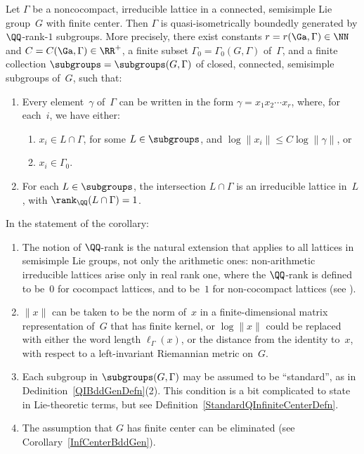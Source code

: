 \begin{cor} \label{QIBddGenLie}
Let $\Gamma$ be a noncocompact, irreducible lattice in a connected, semisimple Lie group~$G$ with finite center. Then $\Gamma$ is quasi-isometrically boundedly generated by $\QQ$-rank-$1$ subgroups. More precisely, there exist constants $r = r(\Ga,\Gamma) \in \NN$ and $C = C(\Ga,\Gamma) \in \RR^+$, a finite subset $\Gamma_0 = \Gamma_0(G,\Gamma)$ of~$\Gamma$, and a finite collection $\subgroups = \subgroups(G,\Gamma)$ of closed, connected, semisimple subgroups of~$G$, such that:
	\begin{enumerate}\itemsep=0pt
\item[$1.$] %
	 Every element~$\gamma$ of~$\Gamma$ can be written in the form $\gamma = x_1 x_2 \cdots x_r$, where, for each~$i$, we have either:
\begin{enumerate}\itemsep=0pt
\item[$(a)$] %
		$x_i \in L \cap \Gamma$, for some $L \in \subgroups$, and $\log \|x_i\| \le C \log \|\gamma\|$,
		or
\item[$(b)$] $x_i \in \Gamma_0$.
		\end{enumerate}
\item[$2.$] For each $L \in \subgroups$, the intersection $L \cap \Gamma$ is an irreducible lattice in~$L$, with $\rank_\QQ (L \cap \Gamma) = 1$.

	\end{enumerate}
\end{cor}

\begin{rems}
In the statement of the corollary:
\begin{enumerate}\itemsep=0pt
	\item The notion of $\QQ$-rank is the natural extension that applies to all lattices in semisimple Lie groups, not only the arithmetic ones: non-arithmetic irreducible lattices arise only in real rank one, where the $\QQ$-rank is defined to be~$0$ for cocompact lattices, and to be~$1$ for non-cocompact lattices (see \cite[Definition~9.1.8, pp.~193--194]{Morris-IntroArithGrps}).
	\item $\| x \|$ can be taken to be the norm of~$x$ in a finite-dimensional matrix representation of~$G$ that has finite kernel, or $\log \|x\|$ could be replaced with either the word length $\ell_\Gamma(x)$, or the distance from the identity to~$x$, with respect to a left-invariant Riemannian metric on~$G$.
	\item Each subgroup in $\subgroups(G,\Gamma)$ may be assumed to be ``standard'', as in Dedinition~\ref{QIBddGenDefn}(2). This condition is a bit complicated to state in Lie-theoretic terms, but see Definition~\ref{StandardQInfiniteCenterDefn}.
	\item The assumption that $G$ has finite center can be eliminated (see Corollary~\ref{InfCenterBddGen}).
	\end{enumerate}
\end{rems}

